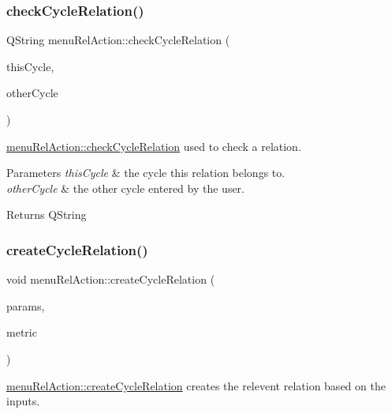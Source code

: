\subsubsection{\texorpdfstring{check\+Cycle\+Relation()}{checkCycleRelation()}}
{\footnotesize\ttfamily Q\+String menu\+Rel\+Action\+::check\+Cycle\+Relation (\begin{DoxyParamCaption}\item[{const Gi\+Na\+C\+::ex \&}]{this\+Cycle,  }\item[{const Gi\+Na\+C\+::ex \&}]{other\+Cycle }\end{DoxyParamCaption})}



\mbox{\hyperlink{classmenu_rel_action_ab3a724c2d09de8a3d253210ec3a0e0d3}{menu\+Rel\+Action\+::check\+Cycle\+Relation}} used to check a relation. 


\begin{DoxyParams}{Parameters}
{\em this\+Cycle} & the cycle this relation belongs to. \\
\hline
{\em other\+Cycle} & the other cycle entered by the user. \\
\hline
\end{DoxyParams}
\begin{DoxyReturn}{Returns}
Q\+String 
\end{DoxyReturn}
\mbox{\label{classmenu_rel_action_a64a27674825379ba110fb2117a572ffe}} 
\subsubsection{\texorpdfstring{create\+Cycle\+Relation()}{createCycleRelation()}}
{\footnotesize\ttfamily void menu\+Rel\+Action\+::create\+Cycle\+Relation (\begin{DoxyParamCaption}\item[{const Gi\+Na\+C\+::lst \&}]{params,  }\item[{const bool \&}]{metric }\end{DoxyParamCaption})}



\mbox{\hyperlink{classmenu_rel_action_a64a27674825379ba110fb2117a572ffe}{menu\+Rel\+Action\+::create\+Cycle\+Relation}} creates the relevent relation based on the inputs. 


